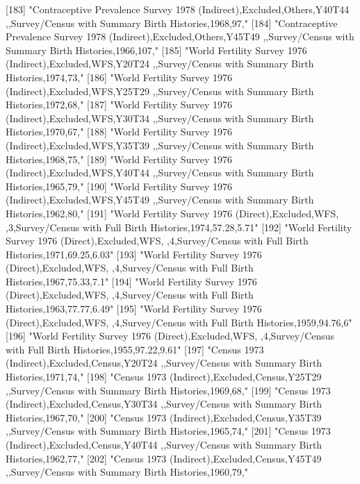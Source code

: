[183] "Contraceptive Prevalence Survey 1978 (Indirect),Excluded,Others,Y40T44 ,,Survey/Census with Summary Birth Histories,1968,97," 
[184] "Contraceptive Prevalence Survey 1978 (Indirect),Excluded,Others,Y45T49 ,,Survey/Census with Summary Birth Histories,1966,107,"
[185] "World Fertility Survey 1976 (Indirect),Excluded,WFS,Y20T24 ,,Survey/Census with Summary Birth Histories,1974,73,"             
[186] "World Fertility Survey 1976 (Indirect),Excluded,WFS,Y25T29 ,,Survey/Census with Summary Birth Histories,1972,68,"             
[187] "World Fertility Survey 1976 (Indirect),Excluded,WFS,Y30T34 ,,Survey/Census with Summary Birth Histories,1970,67,"             
[188] "World Fertility Survey 1976 (Indirect),Excluded,WFS,Y35T39 ,,Survey/Census with Summary Birth Histories,1968,75,"             
[189] "World Fertility Survey 1976 (Indirect),Excluded,WFS,Y40T44 ,,Survey/Census with Summary Birth Histories,1965,79,"             
[190] "World Fertility Survey 1976 (Indirect),Excluded,WFS,Y45T49 ,,Survey/Census with Summary Birth Histories,1962,80,"             
[191] "World Fertility Survey 1976 (Direct),Excluded,WFS, ,3,Survey/Census with Full Birth Histories,1974,57.28,5.71"                
[192] "World Fertility Survey 1976 (Direct),Excluded,WFS, ,4,Survey/Census with Full Birth Histories,1971,69.25,6.03"                
[193] "World Fertility Survey 1976 (Direct),Excluded,WFS, ,4,Survey/Census with Full Birth Histories,1967,75.33,7.1"                 
[194] "World Fertility Survey 1976 (Direct),Excluded,WFS, ,4,Survey/Census with Full Birth Histories,1963,77.77,6.49"                
[195] "World Fertility Survey 1976 (Direct),Excluded,WFS, ,4,Survey/Census with Full Birth Histories,1959,94.76,6"                   
[196] "World Fertility Survey 1976 (Direct),Excluded,WFS, ,4,Survey/Census with Full Birth Histories,1955,97.22,9.61"                
[197] "Census 1973 (Indirect),Excluded,Census,Y20T24 ,,Survey/Census with Summary Birth Histories,1971,74,"                          
[198] "Census 1973 (Indirect),Excluded,Census,Y25T29 ,,Survey/Census with Summary Birth Histories,1969,68,"                          
[199] "Census 1973 (Indirect),Excluded,Census,Y30T34 ,,Survey/Census with Summary Birth Histories,1967,70,"                          
[200] "Census 1973 (Indirect),Excluded,Census,Y35T39 ,,Survey/Census with Summary Birth Histories,1965,74,"                          
[201] "Census 1973 (Indirect),Excluded,Census,Y40T44 ,,Survey/Census with Summary Birth Histories,1962,77,"                          
[202] "Census 1973 (Indirect),Excluded,Census,Y45T49 ,,Survey/Census with Summary Birth Histories,1960,79,"                          

